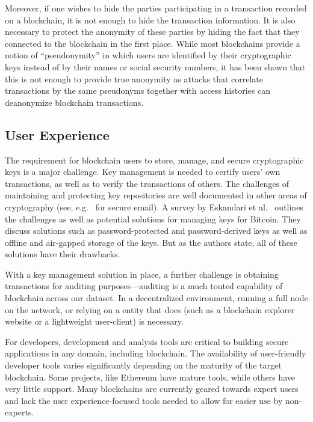 Moreover, if one wishes to hide the parties participating in a transaction recorded on a blockchain, it is not enough to hide the transaction information.  It is also necessary to protect the anonymity of these parties by hiding the fact that they connected to the blockchain in the first place.  While most blockchains provide a notion of ``pseudonymity'' in which users are identified by their cryptographic keys instead of by their names or social security numbers, it has been shown that this is not enough to provide true anonymity as attacks that correlate transactions by the same pseudonyms together with access histories can deanonymize blockchain transactions.

\subsection{User Experience}

The requirement for blockchain users to store, manage, and secure cryptographic keys is a major challenge. Key management is needed to certify users' own transactions, as well as to verify the transactions of others.  The challenges of maintaining and protecting key repositories are well documented in other areas of cryptography (see, e.g.~\cite{uss:WhiTyg99} for secure email). A survey by Eskandari et al.~\cite{arxiv:ECBS18} outlines the challenges as well as potential solutions for managing keys for Bitcoin. They discuss solutions such as password-protected and password-derived keys as well as offline and air-gapped storage of the keys.  But as the authors state, all of these solutions have their drawbacks.

With a key management solution in place, a further challenge is obtaining transactions for auditing purposes---auditing is a much touted capability of blockchain across our dataset. In a decentralized environment, running a full node on the network, or relying on a entity that does (such as a blockchain explorer website or a lightweight user-client) is necessary. 

For developers, development and analysis tools are critical to building secure applications in any domain, including blockchain. The availability of user-friendly developer tools varies significantly depending on the maturity of the target blockchain. Some projects, like Ethereum have mature tools, while others have very little support. Many blockchains are currently geared towards expert users and lack the user experience-focused tools needed to allow for easier use by non-experts.

